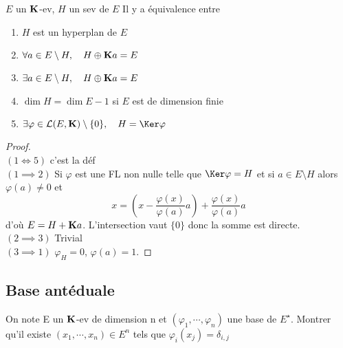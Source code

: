 \begin{thm}
\Hyp $E$ un  $\mathbf K$-ev, $H$ un sev de  $E$
\Conc Il y a équivalence entre \begin{enumerate}
    \item $H$ est un hyperplan de  $E$
    \item  $\forall   a \in  E\setminus H, \quad  H\oplus \mathbf K a=E$
    \item $ \exists a \in  E\setminus H, \quad  H\oplus \mathbf K a=E$
    \item $\dim H=\dim E-1$ si  $E$ est de dimension finie
    \item  $ \exists  \varphi \in  \mathcal  L(E, \K)\setminus \{0\}, \quad  H=\Ker \varphi$
\end{enumerate}
\end{thm}

\begin{proof}~\\
    $(1 \iff 5)$ c'est la déf \\
        $(1\implies 2)$ Si $\varphi$ est une FL non nulle telle que  $\Ker\varphi=H$ et si  $a \in  E\setminus H$ alors $\varphi(a)\neq 0$ et  \[
            x=\left(x-\frac{\varphi(x)}{\varphi(a)}a\right)+\frac{\varphi(x)}{\varphi(a)}a
        \] 
        d'où $E=H+\mathbf K a$. L'intersection vaut $\{ 0\} $ donc la somme est directe. \\
        $(2\implies 3)$ Trivial\\
        $(3\implies 1)$ $\varphi_{H}=0$, $\varphi(a)=1$.
\end{proof}

\subsection{Base antéduale}

\begin{exo}
On note E un $\mathbf K$-ev de dimension n et $(\varphi_1,\cdots,\varphi_n)$ une base de $E^\star$. Montrer qu'il existe $(x_1,\cdots,x_n)\in  E^n$ tels que $\varphi_i(x_j) = \delta_{i,j}$
\end{exo}

